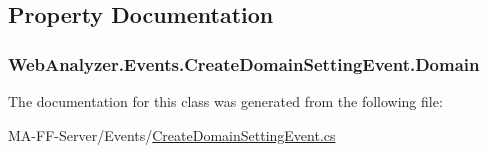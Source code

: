 \subsection{Property Documentation}
\hypertarget{class_web_analyzer_1_1_events_1_1_create_domain_setting_event_a38563439a3da6789afcb3dc1e3fb30e3}{}
\subsubsection[{Domain}]{ Web\+Analyzer.\+Events.\+Create\+Domain\+Setting\+Event.\+Domain\hspace{0.3cm}{\ttfamily [get]}}\label{class_web_analyzer_1_1_events_1_1_create_domain_setting_event_a38563439a3da6789afcb3dc1e3fb30e3}


The documentation for this class was generated from the following file\+:\begin{DoxyCompactItemize}
\item 
M\+A-\/\+F\+F-\/\+Server/\+Events/\hyperlink{_create_domain_setting_event_8cs}{Create\+Domain\+Setting\+Event.\+cs}\end{DoxyCompactItemize}
